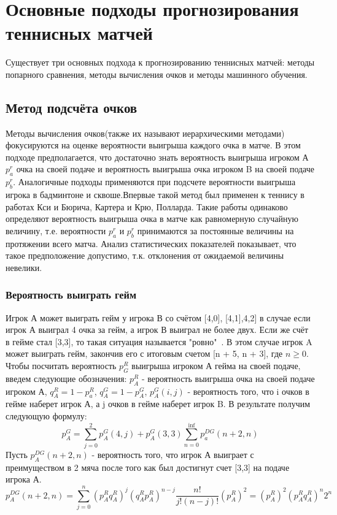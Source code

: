\section{Основные подходы прогнозирования теннисных матчей}
Существует три основных подхода к прогнозированию теннисных матчей: методы попарного сравнения, методы вычисления очков и методы машинного обучения.
\subsection{Метод подсчёта очков}
Методы вычисления очков(также их называют иерархическими методами) фокусируются на оценке вероятности выигрыша каждого очка в матче. 
В этом подходе предполагается, что достаточно знать вероятность выигрыша игроком А $p_a^r$ очка на своей подаче и вероятность выигрыша очка игроком B на своей подаче $p_b^r$. Аналогичные подходы  применяются при подсчете вероятности выигрыша игрока в бадминтоне и сквоше\cite{Book06}.Впервые такой метод был применен к теннису в работах Кси и Бюрича\cite{Book05}, Картера и Крю\cite{Book07}, Полларда\cite{Book08}.
Такие работы одинаково определяют вероятность выигрыша очка в матче как равномерную случайную величину, т.е. вероятности  $p_a^r$ и  $p_b^r$ принимаются за постоянные величины на протяжении всего матча. Анализ статистических показателей показывает, что такое предположение допустимо\cite{Book09}, т.к. отклонения от ожидаемой величины невелики.
\subsubsection{Вероятность выиграть гейм}
Игрок А может выиграть гейм у игрока В со счётом [4,0], [4,1],4,2] в случае если игрок А выиграл 4 очка за гейм, а игрок В выиграл не более двух. Если же счёт в гейме стал [3,3], то такая ситуация называется "ровно"\ . В этом случае игрок A может выиграть гейм, закончив его с итоговым счетом [n + 5, n + 3], где $n\geq0$. Чтобы посчитать вероятность $p_G^R$ выигрыша игроком А гейма на своей подаче, введем следующие обозначения: $p_A^R$ - вероятность выигрыша очка на своей подаче игроком А, $q_A^R=1-p_a^R$, $q_A^G = 1 - p_A^G$, $p_A^G(i,j)$ - вероятность того, что i очков в гейме наберет игрок А, а j очков в гейме наберет игрок B. В результате получим следующую формулу:
\begin{equation}
p_A^G=\sum\limits^{2}_{j=0}{p_A^G(4,j)  + p_A^G(3,3)\sum\limits^{\inf}_{n=0}p_a^{DG}(n + 2, n)}
\end{equation}
Пусть $p_A^{DG}(n + 2, n)$ - вероятность того, что игрок А выиграет с преимуществом в 2 мяча после того как был достигнут счет [3,3] на подаче игрока А.
\begin{equation}
p_A^{DG}(n+2,n)=\sum\limits^{n}_{j=0}{(p_A^Rq_A^R)^j(q^R_Ap^R_A)^{n-j}\frac{n!}{j!(n-j)!}}(p^R_A)^2=(p^R_A)^2(p^R_Aq^R_A)^n2^n
\end{equation}


